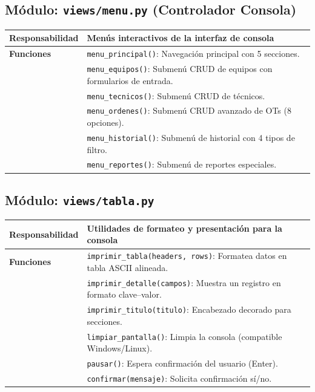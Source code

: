 \documentclass[12pt, a4paper]{article}
\begin{document}
\subsection{Módulo: \texttt{views/menu.py} (Controlador Consola)}

\begin{table}[H]
    \centering
    \begin{tabularx}{\textwidth}{l X}
        \toprule
        \textbf{Responsabilidad} & Menús interactivos de la interfaz de consola \\
        \midrule
        \textbf{Funciones} & \texttt{menu\_principal()}: Navegación principal con 5 secciones. \\
        & \texttt{menu\_equipos()}: Submenú CRUD de equipos con formularios de entrada. \\
        & \texttt{menu\_tecnicos()}: Submenú CRUD de técnicos. \\
        & \texttt{menu\_ordenes()}: Submenú CRUD avanzado de OTs (8 opciones). \\
        & \texttt{menu\_historial()}: Submenú de historial con 4 tipos de filtro. \\
        & \texttt{menu\_reportes()}: Submenú de reportes especiales. \\
        \bottomrule
    \end{tabularx}
\end{table}

\subsection{Módulo: \texttt{views/tabla.py}}

\begin{table}[H]
    \centering
    \begin{tabularx}{\textwidth}{l X}
        \toprule
        \textbf{Responsabilidad} & Utilidades de formateo y presentación para la consola \\
        \midrule
        \textbf{Funciones} & \texttt{imprimir\_tabla(headers, rows)}: Formatea datos en tabla ASCII alineada. \\
        & \texttt{imprimir\_detalle(campos)}: Muestra un registro en formato clave--valor. \\
        & \texttt{imprimir\_titulo(titulo)}: Encabezado decorado para secciones. \\
        & \texttt{limpiar\_pantalla()}: Limpia la consola (compatible Windows/Linux). \\
        & \texttt{pausar()}: Espera confirmación del usuario (Enter). \\
        & \texttt{confirmar(mensaje)}: Solicita confirmación sí/no. \\
        \bottomrule
    \end{tabularx}
\end{table}
\end{document}
